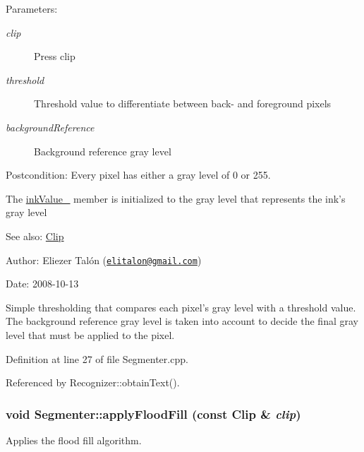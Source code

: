 \begin{Desc}
\item[Parameters:]
\begin{description}
\item[{\em clip}]Press clip \item[{\em threshold}]Threshold value to differentiate between back- and foreground pixels \item[{\em backgroundReference}]Background reference gray level\end{description}
\end{Desc}
\begin{Desc}
\item[Postcondition:]Every pixel has either a gray level of 0 or 255. 

The \hyperlink{class_segmenter_fa6183f99aa6011399783652b341a43b}{inkValue\_\-} member is initialized to the gray level that represents the ink's gray level\end{Desc}
\begin{Desc}
\item[See also:]\hyperlink{class_clip}{Clip}\end{Desc}
\begin{Desc}
\item[Author:]Eliezer Talón (\href{mailto:elitalon@gmail.com}{\tt elitalon@gmail.com}) \end{Desc}
\begin{Desc}
\item[Date:]2008-10-13\end{Desc}
Simple thresholding that compares each pixel's gray level with a threshold value. The background reference gray level is taken into account to decide the final gray level that must be applied to the pixel. 

Definition at line 27 of file Segmenter.cpp.

Referenced by Recognizer::obtainText().\hypertarget{class_segmenter_327c88f2d55cb606a67ce778c06cf426}{
\subsubsection[applyFloodFill]{\setlength{\rightskip}{0pt plus 5cm}void Segmenter::applyFloodFill (const {\bf Clip} \& {\em clip})}}
\label{class_segmenter_327c88f2d55cb606a67ce778c06cf426}


Applies the flood fill algorithm. 


